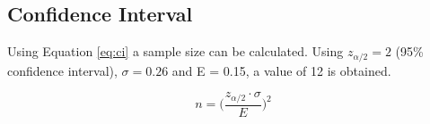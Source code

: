 \documentclass[a4paper]{article}
\begin{document}
\subsection{Confidence Interval} %
\label{sub:confidence_interval}

Using Equation \ref{eq:ci} a sample size can be calculated. Using
$z_{\alpha/2} = 2$ (95\% confidence interval), $\sigma = 0.26$  and E = 0.15,
a value of 12 is obtained.

\begin{equation}
  n = \Big( \frac{z_{\alpha/2} \cdot \sigma}{E} \Big)^2
  \label{eq:ci}
\end{equation}


\custombibliography
\end{document}
